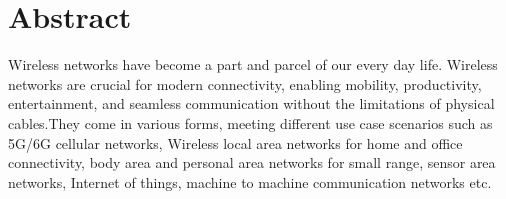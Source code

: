\chapter{Abstract}

Wireless networks have become a part and parcel of our every day life. Wireless networks are crucial for modern connectivity, enabling mobility,  productivity, entertainment, and seamless communication without the limitations of physical cables.They come in various forms, meeting different use case scenarios such as 5G/6G cellular networks, Wireless local area networks for home and office connectivity, body area and personal area networks for small range, sensor area networks, Internet of things, machine to machine communication networks etc. 

